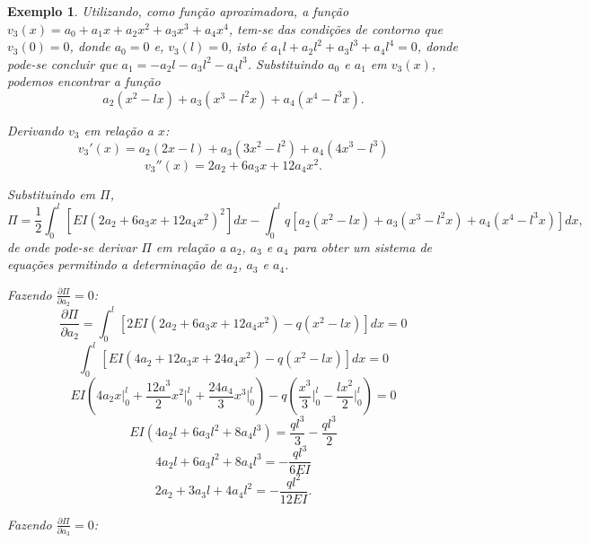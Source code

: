 \documentclass[
	12pt,				%
	openright,			%
    twoside,			%
	a4paper,			%
	english,			%
	french,				%
	spanish,			%
	brazil				%
	]{abntex2}
\theoremstyle{plain}
\newtheorem{example}{Exemplo}
\begin{document}
\begin{example}
	Utilizando, como função aproximadora, a função $v_3(x)=a_0+a_1x+a_2x^2+a_3x^3+a_4x^4$, tem-se das condições de contorno que $v_3(0)=0$, donde $a_0=0$ e, $v_3(l)=0$, isto é $a_1l+a_2l^2+a_3l^3+a_4l^4=0$, donde pode-se concluir que $a_1=-a_2l-a_3l^2-a_4l^3$. Substituindo $a_0$ e $a_1$ em $v_3(x)$, podemos encontrar a função
	$$
		a_2 (x^2 - lx)
		+
		a_3 (x^3 - l^2x)
		+
		a_4 (x^4 - l^3x)
		\text{.}
	$$
	
	Derivando $v_3$ em relação a $x$:
	$$
		v_3'(x)=
		a_2(2x - l)
		+
		a_3(3x^2 - l^2)
		+
		a_4(4x^3 - l^3)
	$$
	$$
		v_3''(x)=
		2a_2
		+
		6a_3 x
		+
		12a_4 x^2
		\text{.}
	$$
	
	Substituindo em $\Pi$,
	$$
		\Pi = \frac{1}{2} \int_0^l \left [
			EI(2a_2+6a_3x+12a_4x^2)^2
		\right ] dx
		-
		\int_0^l q \left [
			a_2(x^2 - lx)
			+
			a_3(x^3 - l^2x)
			+
			a_4(x^4 - l^3x)
		\right ] dx
		\text{,}
	$$
	de onde pode-se derivar $\Pi$ em relação a $a_2$, $a_3$ e $a_4$ para obter um sistema de equações permitindo a determinação de $a_2$, $a_3$ e $a_4$.
	
	Fazendo $\frac{\partial \Pi}{\partial a_2} = 0$:
	$$
		\frac{\partial \Pi}{\partial a_2}
		=
		\int_0^l \left [
			2EI(2a_2 + 6a_3x + 12a_4x^2)
			-
			q(x^2 - lx)
		\right ] dx
		= 0
	$$
	$$
		\int_0^l \left [
			EI(4a_2 + 12a_3x + 24a_4x^2)
			-
			q(x^2 - lx)
		\right ] dx
		= 0
	$$
	$$
		EI \left (
			4a_2 x \Big |_0^l
			+
			\frac{12a^3}{2}x^2 \Big |_0^l
			+
			\frac{24a_4}{3}x^3 \Big |_0^l
		\right )
		- q
		\left (
			\frac{x^3}{3} \Big |_0^l
			-
			\frac{lx^2}{2} \Big |_0^l
		\right )
		= 0
	$$
	$$
		EI(4a_2l + 6a_3l^2 + 8a_4l^3)
		=
		\frac{ql^3}{3}
		-
		\frac{ql^3}{2}
	$$
	$$
		4a_2l + 6a_3l^2 + 8a_4l^3 = -\frac{ql^3}{6EI}
	$$
	\begin{equation}
		2a_2 + 3a_3l + 4a_4l^2 = -\frac{ql^2}{12EI}
		\text{.}
	\end{equation}
		
	Fazendo $\frac{\partial \Pi}{\partial a_3} = 0$:
		
\end{example}
\end{document}
